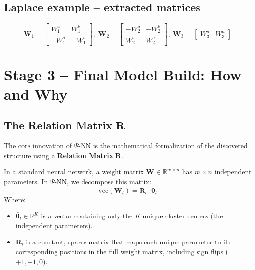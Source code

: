 \documentclass[11pt,a4paper]{article}
\newcommand{\PsiNN}{$\Psi$-NN}
\newcommand{\W}{\mathbf{W}}
\begin{document}
\subsection{Laplace example -- extracted matrices}

\begin{equation}
\W_1\!=\!\begin{bmatrix} W_1^a & W_1^b \\ -W_1^a & -W_1^b \end{bmatrix}\!,\;
\W_2\!=\!\begin{bmatrix} -W_2^a & -W_2^b \\ W_2^b & W_2^a \end{bmatrix}\!,\;
\W_3\!=\!\begin{bmatrix} W_3^a & W_3^a \end{bmatrix}
\end{equation}

\begin{center}
\end{center}

\section{Stage 3 -- Final Model Build: How and Why}

\subsection{The Relation Matrix $\mathbf{R}$}
The core innovation of \PsiNN{} is the mathematical formalization of the discovered structure using a \textbf{Relation Matrix} $\mathbf{R}$.

In a standard neural network, a weight matrix $\mathbf{W} \in \mathbb{R}^{m \times n}$ has $m \times n$ independent parameters. In \PsiNN{}, we decompose this matrix:
\begin{equation}
    \text{vec}(\mathbf{W}_l) = \mathbf{R}_l \cdot \bar{\mathbf{\theta}}_l
\end{equation}
Where:
\begin{itemize}
    \item $\bar{\mathbf{\theta}}_l \in \mathbb{R}^{K}$ is a vector containing only the $K$ unique cluster centers (the independent parameters).
    \item $\mathbf{R}_l$ is a constant, sparse matrix that maps each unique parameter to its corresponding positions in the full weight matrix, including sign flips ($+1, -1, 0$).
\end{itemize}
\end{document}
